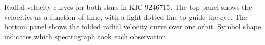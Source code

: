 \label{fig:rvfig} Radial velocity curves for both stars in KIC 9246715. The top panel shows the velocities as a function of time, with a light dotted line to guide the eye. The bottom panel shows the folded radial velocity curve over one orbit. Symbol shape indicates which spectrograph took each observation.